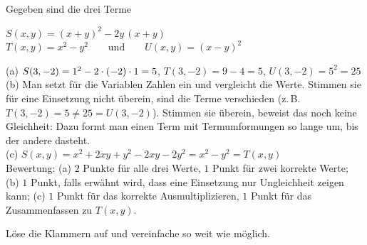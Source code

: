 \documentclass[11pt]{exam}
\begin{document}
\begin{questions}
\noaddpoints
\question[\totalpoints]
\addpoints
Gegeben sind die drei Terme
\begin{center}
	$S(x,y)=(x+y)^2-2y\,(x+y)$\\[4pt]
	$T(x,y)=x^2-y^2\qquad\text{und}\qquad U(x,y)=(x-y)^2$
\end{center}
{\begin{solution}
	(a) $S(3,-2)=1^2-2\cdot(-2)\cdot1=5$, \quad $T(3,-2)=9-4=5$, \quad $U(3,-2)=5^2=25$\\
	(b) Man setzt für die Variablen Zahlen ein und vergleicht die Werte. Stimmen sie für eine Einsetzung nicht überein, sind die Terme verschieden (z.\,B. $T(3,-2)=5\neq 25=U(3,-2)$). Stimmen sie überein, beweist das noch keine Gleichheit: Dazu formt man einen Term mit Termumformungen so lange um, bis der andere dasteht.\\
	(c) $S(x,y)=x^2+2xy+y^2-2xy-2y^2=x^2-y^2=T(x,y)$\\
	Bewertung: (a) $2$ Punkte für alle drei Werte, $1$ Punkt für zwei korrekte Werte; (b) $1$ Punkt, falls erwähnt wird, dass eine Einsetzung nur Ungleichheit zeigen kann; (c) $1$ Punkt für das korrekte Ausmultiplizieren, $1$ Punkt für das Zusammenfassen zu $T(x,y)$.
\end{solution}}
{}



\noaddpoints
\question[\totalpoints] %
\addpoints
Löse die Klammern auf und vereinfache so weit wie möglich.
\begin{parts}

\end{parts}
\end{questions}
\end{document}
